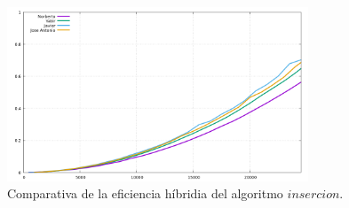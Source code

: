\documentclass[11pt,a4paper]{article}
\begin{document}
\begin{figure}[H]
	\centering
	\includegraphics[width=0.8\textwidth]{../plots/insercion}
	\caption{Comparativa de la eficiencia híbridia del algoritmo $insercion$.}
\end{figure}
\end{document}
